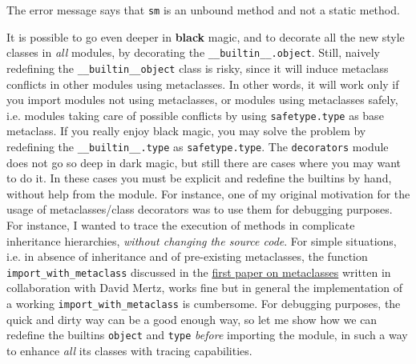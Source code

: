 \documentclass[11pt,english]{article}
\begin{document}
The error message says that \texttt{sm} is an unbound method and not a 
static method.

It is possible to go even deeper in \textbf{black} magic, and to decorate all 
the new style classes in \emph{all} modules, by decorating the 
\texttt{{\_}{\_}builtin{\_}{\_}.object}. Still, naively redefining the \texttt{{\_}{\_}builtin{\_}{\_}object} 
class is risky, since it will induce metaclass conflicts in other modules 
using metaclasses. In other words, it will work only if you import modules 
not using metaclasses, or modules using metaclasses safely, i.e. modules 
taking care of possible conflicts by using \texttt{safetype.type} as base metaclass.
If you really enjoy black magic, you may solve the problem by 
redefining the \texttt{{\_}{\_}builtin{\_}{\_}.type} as  \texttt{safetype.type}.
The \texttt{decorators} module does not go so deep in dark magic, but still
there are cases where you may want to do it. In these cases you must be
explicit and redefine the builtins by hand, without help from the
module. For instance, one of my original motivation for the usage
of metaclasses/class decorators was to use them for debugging purposes.
For instance, I wanted to trace the execution of methods in
complicate inheritance hierarchies, \emph{without changing the source code}.
For simple situations, i.e. in absence of inheritance and of pre-existing
metaclasses, the function \texttt{import{\_}with{\_}metaclass} discussed in the
\href{http://www-106.ibm.com/developerworks/library/l-pymeta.html}{first paper on metaclasses} written in collaboration with David Mertz, works 
fine but in general the implementation of a working \texttt{import{\_}with{\_}metaclass}
is cumbersome. For debugging purposes, the quick and dirty way can be a
good enough way, so let me show how we can redefine the builtins \texttt{object} and
\texttt{type} \emph{before} importing the module, in such a way to enhance \emph{all}
its classes with tracing capabilities.
\end{document}
